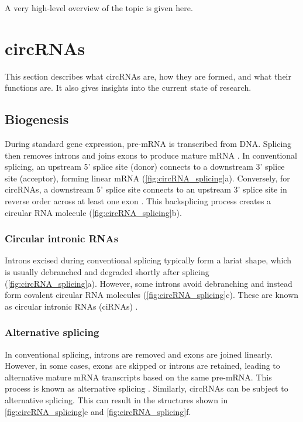A very high-level overview of the topic is given here.

\lipsum[1]

\section{circRNAs}
This section describes what circRNAs are, how they are formed, and what their functions are.
It also gives insights into the current state of research.

\subsection{Biogenesis}
During standard gene expression, pre-mRNA is transcribed from DNA.
Splicing then removes introns and joins exons to produce mature mRNA \supercite{black_mechanisms_2003}.
In conventional splicing, an upstream 5' splice site (donor) connects to a downstream 3' splice site (acceptor), forming linear mRNA (\cref{fig:circRNA_splicing}a).
Conversely, for circRNAs, a downstream 5' splice site connects to an upstream 3' splice site in reverse order across at least one exon \supercite{chen_expanding_2020}.
This backsplicing process creates a circular RNA molecule (\cref{fig:circRNA_splicing}b).

\subsubsection{Circular intronic RNAs}
Introns excised during conventional splicing typically form a lariat shape, which is usually debranched and degraded shortly after splicing (\cref{fig:circRNA_splicing}a).
However, some introns avoid debranching and instead form covalent circular RNA molecules (\cref{fig:circRNA_splicing}c).
These are known as circular intronic RNAs (ciRNAs) \supercite{chen_expanding_2020,zhang_circular_2013}.

\subsubsection{Alternative splicing}
In conventional splicing, introns are removed and exons are joined linearly.
However, in some cases, exons are skipped or introns are retained, leading to alternative mature mRNA transcripts based on the same pre-mRNA.
This process is known as alternative splicing \supercite{nilsen_expansion_2010}.
Similarly, circRNAs can be subject to alternative splicing. This can result in the structures shown in \cref{fig:circRNA_splicing}e and \cref{fig:circRNA_splicing}f.

